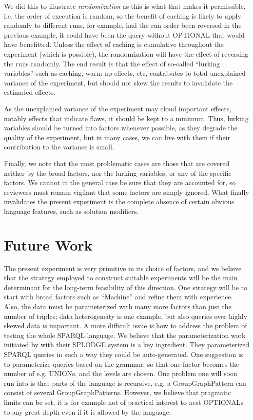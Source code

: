 \documentclass{llncs}
\begin{document}
We did this to illustrate \emph{randomization} as this is what that
makes it permissible, i.e. the order of execution is random, so the
benefit of caching is likely to apply randomly to different runs, for
example, had the run order been reversed in the previous example, it
could have been the query without OPTIONAL that would have
benefitted. Unless the effect of caching is cumulative throughout the
experiment (which is possible), the randomization will have the effect
of reversing the runs randomly. The end result is that the effect of
so-called ``lurking variables'' such as caching, warm-up effects, etc,
contributes to total unexplained variance of the experiment, but
should not skew the results to invalidate the estimated effects.

As the unexplained variance of the experiment may cloud important
effects, notably effects that indicate flaws, it should be kept to a
minimum. Thus, lurking variables should be turned into factors
whenever possible, as they degrade the quality of the experiment, but
in many cases, we can live with them if their contribution to the
variance is small.

Finally, we note that the most problematic cases are those that are
covered neither by the broad factors, nor the lurking variables, or
any of the specific factors. We cannot in the general case be sure
that they are accounted for, so reviewers must remain vigilant that
some factors are simply ignored. What finally invalidates the present
experiment is the complete absence of certain obvious language
features, such as solution modifiers.

\section{Future Work}

The present experiment is very primitive in its choice of factors, and
we believe that the strategy employed to construct suitable
experiments will be the main determinant for the long-term feasibility
of this direction. One strategy will be to start with broad factors
such as ``Machine'' and refine them with experience. Also, the data
must be parameterized with many more factors than just the number of
triples; data heterogeneity \cite{Duan:2011:AOC:1989323.1989340} is one
example, but also queries over highly skewed data is important. A more
difficult issue is how to address the problem of testing the whole
SPARQL language\cite{sparql11query}. We believe that the
parameterization work initiated by \cite{goerlitz2012splodge} with
their SPLODGE system is a key ingredient. They parameterized SPARQL
queries in such a way they could be auto-generated. One suggestion is
to parameterize queries based on the grammar, so that one factor
becomes the number of e.g. UNIONs, and the levels are chosen. One
problem one will soon run into is that parts of the language is
recursive, e.g. a GroupGraphPattern can consist of several
GroupGraphPatterns. However, we believe that pragmatic limits can be
set, it is for example not of practical interest to nest OPTIONALs to
any great depth even if it is allowed by the language.
\end{document}
